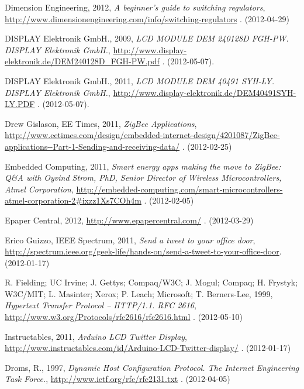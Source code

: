 \documentclass[a4paper,11pt]{article}
\begin{document}
\begin{thebibliography}{9}
\label{dimension}
    Dimension Engineering, 2012,
    \emph{A beginner’s guide to switching regulators},
    \url{http://www.dimensionengineering.com/info/switching-regulators}
    . (2012-04-29)

\label{lcdalfa}
    DISPLAY Elektronik GmbH., 2009,
    \emph{LCD MODULE DEM 240128D FGH-PW. DISPLAY Elektronik GmbH.},
    \url{http://www.display-elektronik.de/DEM240128D_FGH-PW.pdf}
    . (2012-05-07).

\label{lcdgraph}
    DISPLAY Elektronik GmbH., 2011,
    \emph{LCD MODULE DEM 40491 SYH-LY. DISPLAY Elektronik GmbH.},
    \url{http://www.display-elektronik.de/DEM40491SYH-LY.PDF}
    . (2012-05-07).

\label{eetimes}
    Drew Gislason,
    EE Times, 2011,
    \emph{ZigBee Applications},
    \url{ http://www.eetimes.com/design/embedded-internet-design/4201087/ZigBee-applications--Part-1-Sending-and-receiving-data/}
    . (2012-02-25)

\label{embedded}
    Embedded Computing, 2011,
    \emph{Smart energy apps making the move to ZigBee: Q\&A with Oyvind Strom, PhD, Senior Director of Wireless Microcontrollers, Atmel Corporation},
    \url{http://embedded-computing.com/smart-microcontrollers-atmel-corporation-2#ixzz1Xs7COh4m}
    . (2012-02-05)

\label{epapercentral}
    Epaper Central, 2012,
    \url{http://www.epapercentral.com/}
    . (2012-03-29)

\label{spectrum}
    Erico Guizzo, 
    IEEE Spectrum, 2011,
    \emph{Send a tweet to your office door},
    \url{http://spectrum.ieee.org/geek-life/hands-on/send-a-tweet-to-your-office-door}. (2012-01-17)

\label{fielding}
\label{rfc2616}
R. Fielding; UC Irvine; J. Gettys; Compaq/W3C; J. Mogul; Compaq; H. Frystyk; W3C/MIT; L. Masinter; Xerox; P. Leach; Microsoft; T. Berners-Lee, 1999,
\emph{Hypertext Transfer Protocol -- HTTP/1.1. RFC 2616},
\url{http://www.w3.org/Protocols/rfc2616/rfc2616.html}
. (2012-05-10)

\label{instructables}
    Instructables, 2011,
    \emph{Arduino LCD Twitter Display},
    \url{http://www.instructables.com/id/Arduino-LCD-Twitter-display/}
    . (2012-01-17)

\label{droms}
    Droms, R., 1997,
    \emph{Dynamic Host Configuration Protocol. The Internet Engineering Task Force.},
    \url{http://www.ietf.org/rfc/rfc2131.txt}
    . (2012-04-05)


\end{thebibliography}
\end{document}
